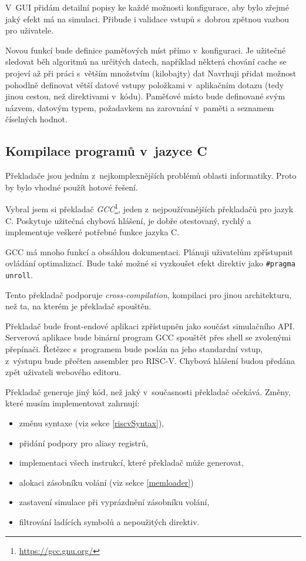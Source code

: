 V~GUI přidám detailní popisy ke každé možnosti konfigurace, aby bylo zřejmé jaký efekt má na simulaci.
Přibude i validace vstupů s~dobrou zpětnou vazbou pro uživatele.

Novou funkcí bude definice paměťových míst přímo v~konfiguraci.
Je užitečné sledovat běh algoritmů na určitých datech, například některá chování cache se projeví až při práci s~větším množstvím (kilobajty) dat
Navrhuji přidat možnost pohodlně definovat větší datové vstupy položkami v~aplikačním dotazu (tedy jinou cestou, než direktivami v~kódu).
Paměťové místo bude definované svým názvem, datovým typem, požadavkem na zarovnání v~paměti a seznamem číselných hodnot.

\subsection{Kompilace programů v~jazyce C}

Překladače jsou jedním z~nejkomplexnějších problémů oblasti informatiky.
Proto by bylo vhodné použít hotové řešení.

Vybral jsem si překladač \emph{GCC}\footnote{\url{https://gcc.gnu.org/}}, jeden z~nejpoužívanějších překladačů pro jazyk C.
Poskytuje užitečná chybová hlášení, je dobře otestovaný, rychlý a implementuje veškeré potřebné funkce jazyka C.

GCC má mnoho funkcí a obsáhlou dokumentaci.
Plánuji uživatelům zpřístupnit ovládání optimalizací.
Bude také možné si vyzkoušet efekt direktiv jako \texttt{\#pragma unroll}. 

Tento překladač podporuje \emph{cross-compilation}, kompilaci pro jinou architekturu, než ta, na kterém je překladač spouštěn.

Překladač bude front-endové aplikaci zpřístupněn jako součást simulačního API. 
Serverová aplikace bude binární program GCC spouštět přes shell se zvolenými přepínači.
Řetězec s~programem bude poslán na jeho standardní vstup, z~výstupu bude přečten assembler pro RISC-V.
Chybová hlášení budou předána zpět uživateli webového editoru.

Překladač generuje jiný kód, než jaký v~současnosti překladač očekává.
Změny, které musím implementovat zahrnují:
\begin{itemize}
    \item změnu syntaxe (viz sekce \ref{riscvSyntax}),
    \item přidání podpory pro aliasy registrů,
    \item implementaci všech instrukcí, které překladač může generovat,
    \item alokaci zásobníku volání (viz sekce \ref{memloader})
    \item zastavení simulace při vyprázdnění zásobníku volání,
    \item filtrování ladících symbolů a nepoužitých direktiv.
\end{itemize}

